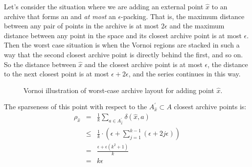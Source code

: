 \documentclass[twoside]{article}
\begin{document}
Let's consider the situation where we are adding an external point $\hat{x}$ to an archive that forms an  and \emph{at most} an $\epsilon$-packing.  That is, the maximum distance between any pair of points in the archive is at most $2\epsilon$ and the maximum distance between any point in the space and its closest archive point is at most $\epsilon$.  Then the worst case situation is when the Vornoi regions are stacked in such a way that the second closest archive point is directly behind the first, and so on.  So the distance between $\hat{x}$ and the closest archive point is at most $\epsilon$, the distance to the next closest point is at most $\epsilon + 2\epsilon$, and the series continues in this way.
%
\begin{figure}[h]
  \center{}
  \caption{\label{fig:vornoi} Vornoi illustration of worst-case archive layout for adding point $\hat{x}$.}
\end{figure}

The sparseness of this point with respect to the $A^\prime_{\hat{x}} \subset A$ closest archive points is:
\begin{eqnarray*}
  \rho_{\hat{x}} & = & \frac{1}{k} \sum_{a \in A^\prime_{\hat{x}}} \delta(\hat{x},a) \\
                 & \leq & \frac{1}{k} \cdot\left( \epsilon + \sum_{j=1}^{k-1} \left( \epsilon + 2j\epsilon \right) \right) \\
                 & = & \frac{\epsilon + \epsilon\left(k^2 +1\right)}{k} \\
                 & = & k\epsilon
\end{eqnarray*}
\end{document}
